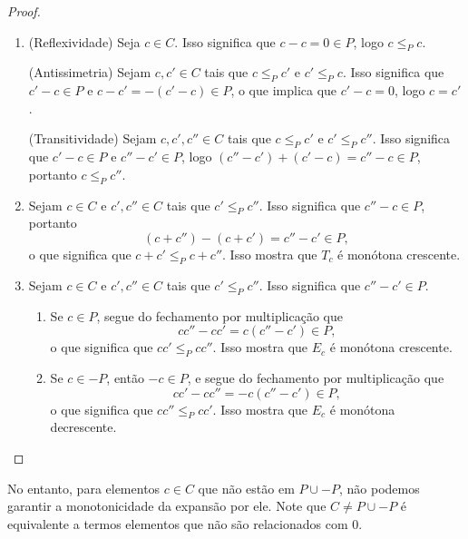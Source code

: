 \begin{proof}
	\begin{enumerate}
	\item (Reflexividade) Seja $c \in C$. Isso significa que $c-c =0 \in P$, logo $c \leq_P c$.

(Antissimetria) Sejam $c,c' \in C$ tais que $c \leq_P c'$ e $c' \leq_P c$. Isso significa que $c'-c \in P$ e $c-c'=-(c'-c) \in P$, o que implica que $c'-c=0$, logo $c=c'$.

(Transitividade) Sejam $c,c',c'' \in C$ tais que $c \leq_P c'$ e $c' \leq_P c''$. Isso significa que $c'-c \in P$ e $c''-c' \in P$, logo $(c''-c') + (c'-c) = c''-c \in P$, portanto $c \leq_P c''$.

	\item Sejam $c \in C$ e $c',c'' \in C$ tais que $c' \leq_P c''$. Isso significa que $c''-c \in P$, portanto
	\begin{equation*}
	(c+c'') - (c+c') = c''-c' \in P,
	\end{equation*}
o que significa que $c+c' \leq_P c+c''$. Isso mostra que $T_c$ é monótona crescente.

	\item Sejam $c \in C$ e $c',c'' \in C$ tais que $c' \leq_P c''$. Isso significa que $c''-c' \in P$.
		\begin{enumerate}
		\item Se $c \in P$, segue do fechamento por multiplicação que
	\begin{equation*}
	cc''-cc' = c(c''-c') \in P,
	\end{equation*}
o que significa que $cc' \leq_P cc''$. Isso mostra que $E_c$ é monótona crescente.
		
		\item Se $c \in -P$, então $-c \in P$, e segue do fechamento por multiplicação que
	\begin{equation*}
	cc'-cc'' = -c(c''-c') \in P,
	\end{equation*}
o que significa que $cc'' \leq_P cc'$. Isso mostra que $E_c$ é monótona decrescente.
		\end{enumerate}
	\end{enumerate}
\end{proof}

No entanto, para elementos $c \in C$ que não estão em $P \cup -P$, não podemos garantir a monotonicidade da expansão por ele. Note que $C \neq P \cup -P$ é equivalente a termos elementos que não são relacionados com $0$.

